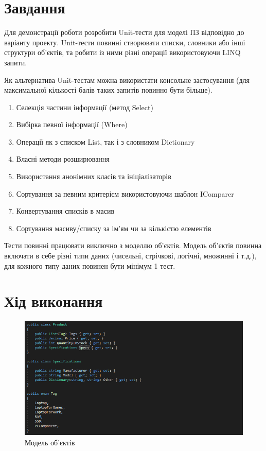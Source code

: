 \documentclass[oneside,14pt]{extarticle}
\begin{document}
\begin{normalsize}
	\section*{Завдання}
	Для демонстрації роботи розробити Unit-тести для моделі ПЗ відповідно до
	варіанту проекту. Unit-тести повинні створювати списки, словники або інші структури
	об’єктів, та робити із ними різні операції використовуючи LINQ запити.
	
	Як альтернатива Unit-тестам можна використати консольне застосування (для
	максимальної кількості балів таких запитів повинно бути більше).
	\begin{enumerate}
		\item Селекція частини інформації (метод Select)
		\item Вибірка певної інформації (Where)
		\item Операції як з списком List, так і з словником Dictionary
		\item Власні методи розширювання
		\item Використання анонімних класів та ініціалізаторів
		\item Сортування за певним критерієм використовуючи шаблон IComparer
		\item Конвертування списків в масив
		\item Сортування масиву/списку за ім’ям чи за кількістю елементів
	\end{enumerate}

Тести повинні працювати виключно з моделлю об’єктів. Модель об'єктів повинна
включати в себе різні типи даних (чисельні, стрічкові, логічні, множинні і т.д.), для
кожного типу даних повинен бути мінімум 1 тест.

	\section*{Хід виконання}
	
	\begin{figure}[H]
		\centering
		\includegraphics[width=\textwidth]{11}
		\caption{Модель об'єктів}
	\end{figure}


\end{normalsize}
\end{document}
